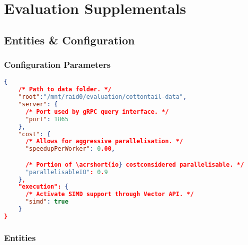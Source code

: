 \chapter{Evaluation Supplementals}
\label{chapter:appendix_supplementals}

\section*{\cottontail{} Entities \& Configuration}

\subsection*{Configuration Parameters}

\begin{lstlisting}[language=json, caption={Cottontail DB configuration used during the evaluation (config.json).}, label=listing:cottontail_config, numbers=none]
{
    /* Path to data folder. */
    "root":"/mnt/raid0/evaluation/cottontail-data",
    "server": {
      /* Port used by gRPC query interface. */
      "port": 1865
    },
    "cost": {
      /* Allows for aggressive parallelisation. */
      "speedupPerWorker": 0.00,  

      /* Portion of \acrshort{io} costconsidered parallelisable. */
      "parallelisableIO": 0.9
    },
    "execution": {
      /* Activate SIMD support through Vector API. */
      "simd": true
    }
} 
\end{lstlisting}

\subsection*{Entities}

